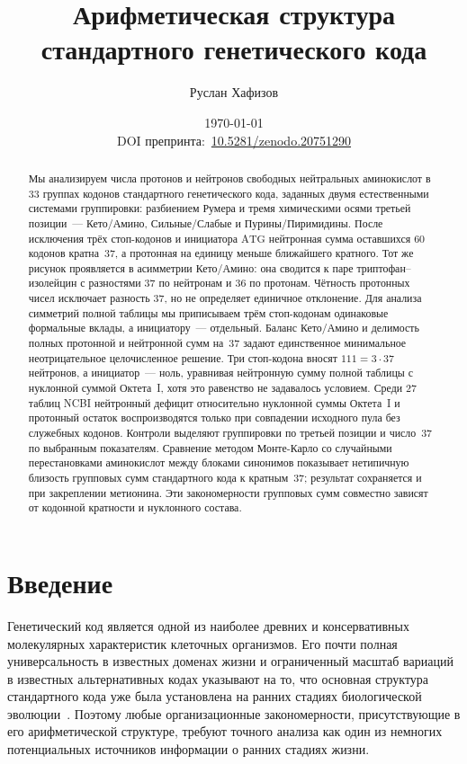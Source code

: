 \documentclass[11pt,a4paper]{article}
\title{Арифметическая структура стандартного генетического кода}
\author{Руслан Хафизов}
\date{\today\\[1ex]
\small DOI препринта:~\href{https://doi.org/10.5281/zenodo.20751290}{10.5281/zenodo.20751290}}
\renewcommand{\_}{\origunderscore\allowbreak}
\begin{document}
\maketitle

\begin{abstract}
Мы анализируем числа протонов и нейтронов свободных нейтральных
аминокислот в $33$ группах кодонов стандартного генетического
кода, заданных двумя естественными системами группировки:
разбиением Румера и тремя химическими осями третьей позиции~---
Кето/Амино, Сильные/Слабые и Пурины/Пиримидины. После исключения трёх стоп-кодонов и инициатора
$\mathrm{ATG}$ нейтронная сумма оставшихся $60$ кодонов
кратна~$37$, а протонная на единицу меньше ближайшего
кратного. Тот же рисунок проявляется в асимметрии
Кето/Амино: она сводится к паре триптофан--изолейцин
с разностями $37$ по нейтронам и $36$ по протонам.
Чётность протонных чисел исключает разность $37$,
но не определяет единичное отклонение.
Для анализа симметрий полной таблицы мы приписываем
трём стоп-кодонам одинаковые формальные вклады,
а инициатору~--- отдельный. Баланс Кето/Амино
и делимость полных протонной и нейтронной сумм
на~$37$ задают единственное минимальное неотрицательное
целочисленное решение. Три стоп-кодона вносят $111=3\cdot37$ нейтронов,
а инициатор~--- ноль, уравнивая нейтронную сумму
полной таблицы с нуклонной суммой Октета~I,
хотя это равенство не задавалось условием. Среди $27$ таблиц NCBI нейтронный дефицит относительно
нуклонной суммы Октета~I и протонный остаток
воспроизводятся только при совпадении исходного
пула без служебных кодонов. Контроли выделяют группировки
по третьей позиции и число~$37$ по выбранным показателям.
Сравнение методом Монте-Карло со случайными перестановками
аминокислот между блоками синонимов показывает нетипичную
близость групповых сумм стандартного кода к кратным~$37$;
результат сохраняется и при закреплении метионина. Эти закономерности групповых
сумм совместно зависят от кодонной кратности
и нуклонного состава.
\end{abstract}

\tableofcontents

\section{Введение}
\label{sec:introduction}

Генетический код является одной из наиболее
древних и консервативных молекулярных
характеристик клеточных организмов. Его почти
полная универсальность в известных доменах
жизни и ограниченный масштаб вариаций в
известных альтернативных кодах указывают на
то, что основная структура стандартного кода
уже была установлена на ранних стадиях
биологической эволюции~\cite{crick1968}. Поэтому любые организационные закономерности, присутствующие в его арифметической структуре, требуют точного анализа как один из немногих потенциальных источников информации о ранних стадиях жизни.
\end{document}
